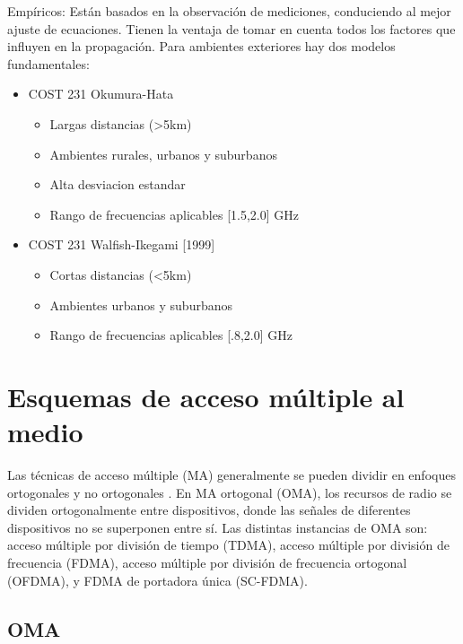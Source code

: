 Empíricos: Están basados en la observación de mediciones, conduciendo al mejor ajuste de ecuaciones. Tienen la ventaja de tomar en cuenta todos los factores que influyen en la propagación.\newline
Para ambientes exteriores hay dos modelos fundamentales:
\begin{itemize}
    \item COST 231 Okumura-Hata
    \begin{itemize}
        \item Largas distancias (>5km)
        \item Ambientes rurales, urbanos y suburbanos
        \item Alta desviacion estandar
        \item Rango de frecuencias aplicables [1.5,2.0] GHz
    \end{itemize}
    \item COST 231 Walfish-Ikegami [1999]
    \begin{itemize}
        \item Cortas distancias (<5km)
        \item Ambientes urbanos y suburbanos
        \item Rango de frecuencias aplicables [.8,2.0] GHz
    \end{itemize}
\end{itemize}



\section{Esquemas de acceso múltiple al medio}
Las técnicas de acceso múltiple (MA) generalmente se pueden dividir en enfoques ortogonales y no ortogonales \parencite{Tse2004}. En MA ortogonal (OMA), los recursos de radio se dividen ortogonalmente entre dispositivos, donde las señales de diferentes dispositivos no se superponen entre sí. Las distintas instancias de OMA son: acceso múltiple por división de tiempo (TDMA), acceso múltiple por división de frecuencia (FDMA), acceso múltiple por división de frecuencia ortogonal (OFDMA), y FDMA de portadora única (SC-FDMA).

\subsection{OMA}

